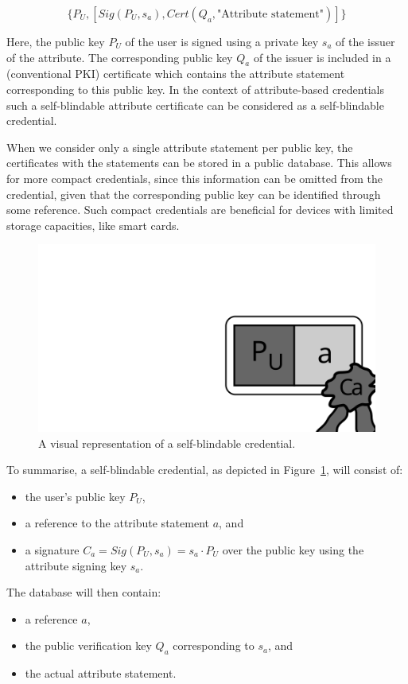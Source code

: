 $$\{P_U, [Sig(P_U, s_a), Cert(Q_a, \text{"Attribute statement"})]\}$$

Here, the public key $P_U$ of the user is signed using a private key $s_a$ of
the issuer of the attribute. The corresponding public key $Q_a$ of the issuer is
included in a (conventional PKI) certificate which contains the attribute
statement corresponding to this public key. In the context of attribute-based
credentials such a self-blindable attribute certificate can be considered as a
self-blindable credential.

When we consider only a single attribute statement 
per public key, the certificates with the statements
can be stored in a public database. This allows for more compact credentials, 
since this information can be omitted from the credential, given that the 
corresponding public key can be identified through some reference. Such compact 
credentials are beneficial for devices with limited storage capacities, like 
smart cards.

\begin{figure}[t]
  \centering
  \includegraphics[scale=.45]{images/sbc-credential}
  \caption{A visual representation of a self-blindable credential.}
  \label{fig:SBC-credential}
\end{figure}

\noindent To summarise, a self-blindable credential, as depicted in
Figure~\ref{fig:SBC-credential}, will consist of:
\begin{itemize}
  \item the user's public key $P_U$,
  \item a reference to the attribute statement $a$, and
  \item a signature $C_a = Sig(P_U, s_a) = s_a \cdot P_U$ over the public key
    using the attribute signing key $s_a$.
\end{itemize}
The database will then contain:
\begin{itemize}
  \item a reference $a$,
  \item the public verification key $Q_a$ corresponding to $s_a$, and
  \item the actual attribute statement.
\end{itemize}

